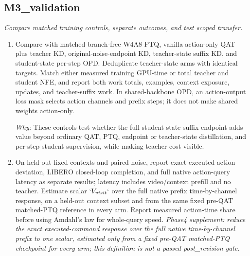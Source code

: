 \documentclass[10pt,a4paper]{article}
\begin{document}
\subsection*{M3\_validation}
\emph{Compare matched training controls, separate outcomes, and test scoped transfer.}
\begin{enumerate}[leftmargin=*,start=5]
  \item Compare with matched branch-free W4A8 PTQ, vanilla action-only QAT plus teacher KD, original-noise-endpoint KD, teacher-state suffix KD, and student-state per-step OPD. Deduplicate teacher-state arms with identical targets. Match either measured training GPU-time or total teacher and student NFE, and report both work totals, examples, context exposure, updates, and teacher-suffix work. In shared-backbone OPD, an action-output loss mask selects action channels and prefix steps;\allowbreak{} it does not make shared weights action-only.
\par\emph{Why:} These controls test whether the full student-state suffix endpoint adds value beyond ordinary QAT, PTQ, endpoint or teacher-state distillation, and per-step student supervision, while making teacher cost visible.
  \item On held-out fixed contexts and paired noise, report exact executed-action deviation, LIBERO closed-loop completion, and full native action-query latency as separate results;\allowbreak{} latency includes video/context prefill and no teacher. Estimate scalar \(`V_{visit}`\) over the full native prefix time-by-channel response, on a held-out context subset and from the same fixed pre-QAT matched-PTQ reference in every arm. Report measured action-time share before using Amdahl's law for whole-query speed.
\noindent\emph{Phase4 supplement: reduce the exact executed-command response over the full native time-by-channel prefix to one scalar, estimated only from a fixed pre-QAT matched-PTQ checkpoint for every arm;\allowbreak{} this definition is not a passed post\_revision gate.}
\par{}

\end{enumerate}
\end{document}
